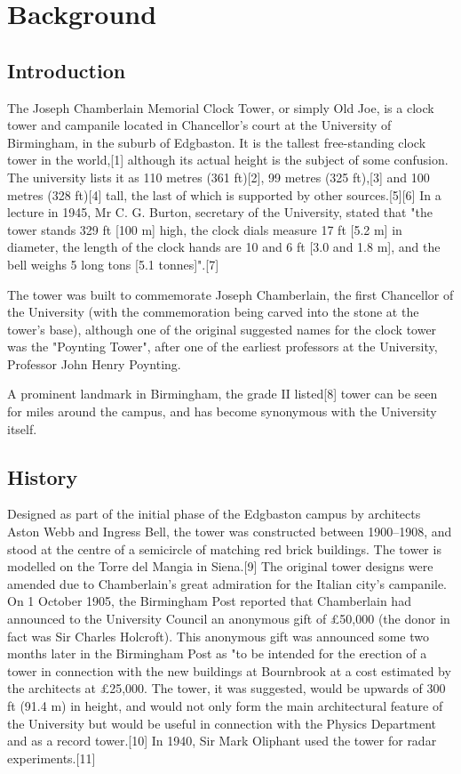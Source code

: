 \chapter{Background}

\section{Introduction}


The Joseph Chamberlain Memorial Clock Tower, or simply Old Joe, is a clock tower and campanile located in Chancellor's court at the University of Birmingham, in the suburb of Edgbaston. It is the tallest free-standing clock tower in the world,[1] although its actual height is the subject of some confusion. The university lists it as 110 metres (361 ft)[2], 99 metres (325 ft),[3] and 100 metres (328 ft)[4] tall, the last of which is supported by other sources.[5][6] In a lecture in 1945, Mr C. G. Burton, secretary of the University, stated that "the tower stands 329 ft [100 m] high, the clock dials measure 17 ft [5.2 m] in diameter, the length of the clock hands are 10 and 6 ft [3.0 and 1.8 m], and the bell weighs 5 long tons [5.1 tonnes]".[7]

The tower was built to commemorate Joseph Chamberlain, the first Chancellor of the University (with the commemoration being carved into the stone at the tower's base), although one of the original suggested names for the clock tower was the "Poynting Tower", after one of the earliest professors at the University, Professor John Henry Poynting.

A prominent landmark in Birmingham, the grade II listed[8] tower can be seen for miles around the campus, and has become synonymous with the University itself. 

\section{History}

Designed as part of the initial phase of the Edgbaston campus by architects Aston Webb and Ingress Bell, the tower was constructed between 1900–1908, and stood at the centre of a semicircle of matching red brick buildings. The tower is modelled on the Torre del Mangia in Siena.[9] The original tower designs were amended due to Chamberlain's great admiration for the Italian city's campanile. On 1 October 1905, the Birmingham Post reported that Chamberlain had announced to the University Council an anonymous gift of £50,000 (the donor in fact was Sir Charles Holcroft). This anonymous gift was announced some two months later in the Birmingham Post as "to be intended for the erection of a tower in connection with the new buildings at Bournbrook at a cost estimated by the architects at £25,000. The tower, it was suggested, would be upwards of 300 ft (91.4 m) in height, and would not only form the main architectural feature of the University but would be useful in connection with the Physics Department and as a record tower.[10] In 1940, Sir Mark Oliphant used the tower for radar experiments.[11]

